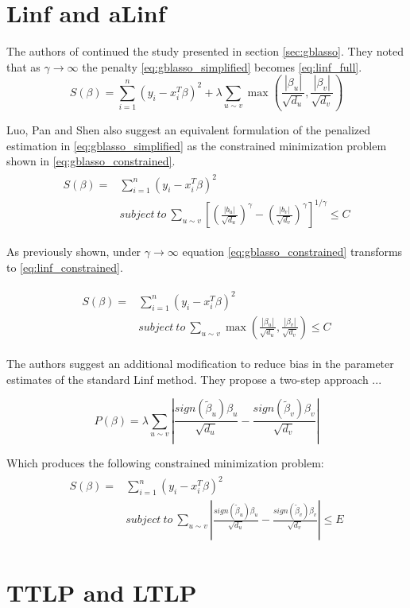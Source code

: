 \section{Linf and aLinf}
The authors of \cite{luo2012two} continued the study presented in section \ref{sec:gblasso}. They noted that as $\gamma\rightarrow\infty$ the penalty \ref{eq:gblasso_simplified} becomes \ref{eq:linf_full}.
\begin{equation} \label{eq:linf_full}
S(\beta) = \sum_{i=1}^{n} (y_i - x_i^T\beta)^2 + 
\lambda\sum_{u \sim v}\max\left(\frac{|\beta_u|}{\sqrt{d_u}},\frac{|\beta_v|}{\sqrt{d_v}}\right)
\end{equation}

Luo, Pan and Shen also suggest an equivalent formulation of the penalized estimation in \ref{eq:gblasso_simplified} as the constrained minimization problem shown in \ref{eq:gblasso_constrained}.
\begin{align} \label{eq:gblasso_constrained}
\begin{split}
S(\beta) = &\sum_{i=1}^{n} (y_i - x_i^T\beta)^2 \\ 
&subject\ to\ \sum_{u \sim v}
\left[\left(\frac{|b_u|}{\sqrt{d_u}}\right)^\gamma-
\left(\frac{|b_v|}{\sqrt{d_v}}\right)^\gamma\right]^{1/\gamma}\leq C
\end{split}
\end{align}

As previously shown, under $\gamma\rightarrow\infty$ equation \ref{eq:gblasso_constrained} transforms to \ref{eq:linf_constrained}. 

\begin{align} \label{eq:linf_constrained}
\begin{split}
S(\beta) = &\sum_{i=1}^{n} (y_i - x_i^T\beta)^2 \\ 
&subject\ to\ \sum_{u \sim v}\max\left(\frac{|\beta_u|}{\sqrt{d_u}},\frac{|\beta_v|}{\sqrt{d_v}}\right)\leq C
\end{split}
\end{align}

The authors suggest an additional modification to reduce bias in the parameter estimates of the standard Linf method. They propose a two-step approach ...

\begin{equation} \label{eq:alinf_pen}
P(\beta) = \lambda\sum_{u \sim v}\left|\frac{sign(\tilde{\beta}_u)\beta_u}{\sqrt{d_u}}-\frac{sign(\tilde{\beta}_v)\beta_v}{\sqrt{d_v}}\right|
\end{equation}

Which produces the following constrained minimization problem:
\begin{align} \label{eq:alinf_constrained}
\begin{split}
S(\beta) = &\sum_{i=1}^{n} (y_i - x_i^T\beta)^2 \\ 
&subject\ to\ \sum_{u \sim v}\left|\frac{sign(\tilde{\beta}_u)\beta_u}{\sqrt{d_u}}-\frac{sign(\tilde{\beta}_v)\beta_v}{\sqrt{d_v}}\right|\leq E
\end{split}
\end{align}


\section{TTLP and LTLP}
